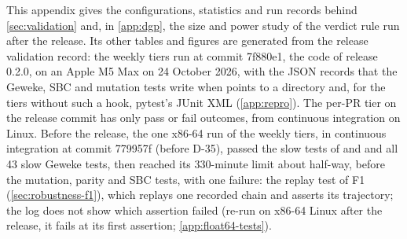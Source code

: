 This appendix gives the configurations, statistics and run records behind
\cref{sec:validation} and, in \cref{app:dgp}, the size and power study of the verdict rule run after
the release. Its other tables and figures are generated from the release validation record: the weekly tiers run at
commit 7f880e1, the code of release 0.2.0, on an Apple M5 Max on 24 October 2026, with the JSON
records that the Geweke, SBC and mutation tests write when  points
to a directory and, for the tiers without such a hook, pytest's JUnit XML (\cref{app:repro}).
The per-PR tier on the release commit has only pass or fail outcomes, from continuous integration
on Linux. Before the release, the one x86-64 run of the weekly tiers, in continuous integration at commit 779957f
(before D-35), passed the slow tests of  and  and all 43
slow Geweke tests, then reached
its 330-minute limit about half-way, before the mutation, parity and SBC tests, with one failure:
the replay test of F1 (\cref{sec:robustness-f1}), which replays one recorded chain and asserts its
trajectory; the log does not show which assertion failed (re-run on x86-64 Linux after the release,
it fails at its first assertion; \cref{app:float64-tests}).

